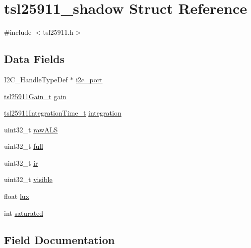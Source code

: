 \hypertarget{structtsl25911__shadow}{}\section{tsl25911\+\_\+shadow Struct Reference}
\label{structtsl25911__shadow}


{\ttfamily \#include $<$tsl25911.\+h$>$}

\subsection*{Data Fields}
\begin{DoxyCompactItemize}
\item 
I2\+C\+\_\+\+Handle\+Type\+Def $\ast$ \hyperlink{structtsl25911__shadow_a2ea135f17cb1cad65c5c8a1271d60f7f}{i2c\+\_\+port}
\item 
\hyperlink{tsl25911_8h_ad5fc151ec2d3b1ceb4d041c74038142b}{tsl25911\+Gain\+\_\+t} \hyperlink{structtsl25911__shadow_a7d9beec975c343566f73faa9789da22e}{gain}
\item 
\hyperlink{tsl25911_8h_a5d32317c041ebe56d2f37287a31c8859}{tsl25911\+Integration\+Time\+\_\+t} \hyperlink{structtsl25911__shadow_ae1947aa883a53459b860e01f2917d4b1}{integration}
\item 
uint32\+\_\+t \hyperlink{structtsl25911__shadow_affe54d7c4e62e4295237aefd360c2509}{raw\+A\+LS}
\item 
uint32\+\_\+t \hyperlink{structtsl25911__shadow_abfbce22e1808c6e83d35368a47f4a203}{full}
\item 
uint32\+\_\+t \hyperlink{structtsl25911__shadow_aaae7193358f86eaf6bc43f36bdf76d80}{ir}
\item 
uint32\+\_\+t \hyperlink{structtsl25911__shadow_aa6e7f70c2670e09d4a72ee8fce35acde}{visible}
\item 
float \hyperlink{structtsl25911__shadow_ac6c849abb3bb12b0e21ea2171b744f94}{lux}
\item 
int \hyperlink{structtsl25911__shadow_ad5a2c522506805a6a1131dab9871d8d1}{saturated}
\end{DoxyCompactItemize}


\subsection{Field Documentation}
\mbox{\label{structtsl25911__shadow_abfbce22e1808c6e83d35368a47f4a203}} 
